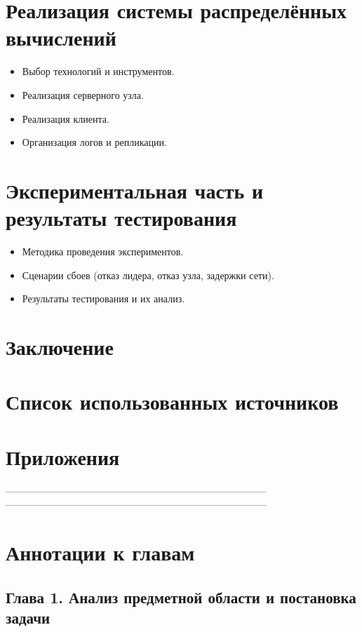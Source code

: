 \section{Реализация системы распределённых вычислений}
\begin{itemize}
    \item Выбор технологий и инструментов.
    \item Реализация серверного узла.
    \item Реализация клиента.
    \item Организация логов и репликации.
\end{itemize}

\section{Экспериментальная часть и результаты тестирования}
\begin{itemize}
    \item Методика проведения экспериментов.
    \item Сценарии сбоев (отказ лидера, отказ узла, задержки сети).
    \item Результаты тестирования и их анализ.
\end{itemize}

\section*{Заключение}

\section*{Список использованных источников}

\section*{Приложения}

--------------------------------------------------------------------------------
--------------------------------------------------------------------------------

\section*{Аннотации к главам}

\subsection*{Глава 1. Анализ предметной области и постановка задачи}

